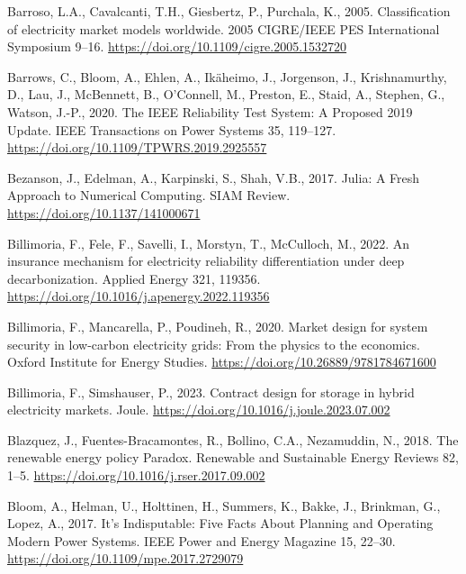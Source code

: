 \documentclass[12pt,a4paper,]{report}
\newlength{\cslhangindent}
\newenvironment{CSLReferences}[2] %
 {%
  \setlength{\parindent}{0pt}
  \ifodd #1 \everypar{\setlength{\hangindent}{\cslhangindent}}\ignorespaces\fi
  \ifnum #2 > 0
  \setlength{\parskip}{#2\baselineskip}
  \fi
 }%
 {}
\begin{document}
\begin{CSLReferences}{1}{0}
\leavevmode{}%
Barroso, L.A., Cavalcanti, T.H., Giesbertz, P., Purchala, K., 2005.
Classification of electricity market models worldwide. 2005 CIGRE/IEEE
PES International Symposium 9--16.
\url{https://doi.org/10.1109/cigre.2005.1532720}

\leavevmode{}%
Barrows, C., Bloom, A., Ehlen, A., Ikäheimo, J., Jorgenson, J.,
Krishnamurthy, D., Lau, J., McBennett, B., O'Connell, M., Preston, E.,
Staid, A., Stephen, G., Watson, J.-P., 2020. The {IEEE Reliability Test
System}: {A Proposed} 2019 {Update}. IEEE Transactions on Power Systems
35, 119--127. \url{https://doi.org/10.1109/TPWRS.2019.2925557}

\leavevmode{}%
Bezanson, J., Edelman, A., Karpinski, S., Shah, V.B., 2017. Julia: {A
Fresh Approach} to {Numerical Computing}. SIAM Review.
\url{https://doi.org/10.1137/141000671}

\leavevmode{}%
Billimoria, F., Fele, F., Savelli, I., Morstyn, T., McCulloch, M., 2022.
An insurance mechanism for electricity reliability differentiation under
deep decarbonization. Applied Energy 321, 119356.
\url{https://doi.org/10.1016/j.apenergy.2022.119356}

\leavevmode{}%
Billimoria, F., Mancarella, P., Poudineh, R., 2020. Market design for
system security in low-carbon electricity grids: From the physics to the
economics. {Oxford Institute for Energy Studies}.
\url{https://doi.org/10.26889/9781784671600}

\leavevmode{}%
Billimoria, F., Simshauser, P., 2023. Contract design for storage in
hybrid electricity markets. Joule.
\url{https://doi.org/10.1016/j.joule.2023.07.002}

\leavevmode{}%
Blazquez, J., Fuentes-Bracamontes, R., Bollino, C.A., Nezamuddin, N.,
2018. The renewable energy policy {Paradox}. Renewable and Sustainable
Energy Reviews 82, 1--5.
\url{https://doi.org/10.1016/j.rser.2017.09.002}

\leavevmode{}%
Bloom, A., Helman, U., Holttinen, H., Summers, K., Bakke, J., Brinkman,
G., Lopez, A., 2017. It's {Indisputable}: {Five Facts About Planning}
and {Operating Modern Power Systems}. IEEE Power and Energy Magazine 15,
22--30. \url{https://doi.org/10.1109/mpe.2017.2729079}


\end{CSLReferences}
\end{document}
